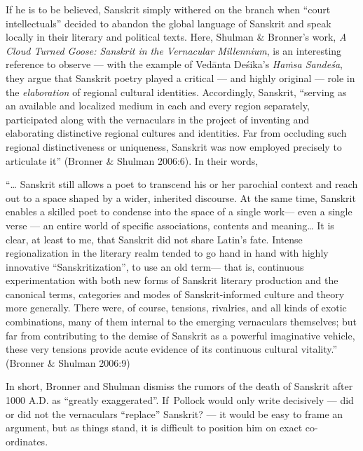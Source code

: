If he is to be believed, Sanskrit simply withered on the branch when “court intellectuals” decided to abandon the global language of Sanskrit and speak locally in their literary and political texts. Here, Shulman \& Bronner’s work, {\sl A Cloud Turned Goose: Sanskrit in the Vernacular Millennium}, is an interesting reference to observe — with the example of Vedānta Deśika’s {\sl Haṁsa Sandeśa}, they argue that Sanskrit poetry played a critical — and highly original — role in the {\sl elaboration} of regional cultural identities. Accordingly, Sanskrit, “serving as an available and localized medium in each and every region separately, participated along with the vernaculars in the project of inventing and elaborating distinctive regional cultures and identities. Far from occluding such regional distinctiveness or uniqueness, Sanskrit was now employed precisely to articulate it” (Bronner \& Shulman 2006:6). In their words,
\begin{myquote}
“… Sanskrit still allows a poet to transcend his or her parochial context and reach out to a space shaped by a wider, inherited discourse. At the same time, Sanskrit enables a skilled poet to condense into the space of a single work— even a single verse — an entire world of specific associations, contents and meaning… It is clear, at least to me, that Sanskrit did not share Latin’s fate. Intense regionalization in the literary realm tended to go hand in hand with highly innovative “Sanskritization”, to use an old term— that is, continuous experimentation with both new forms of Sanskrit literary production and the canonical terms, categories and modes of Sanskrit-informed culture and theory more generally. There were, of course, tensions, rivalries, and all kinds of exotic combinations, many of them internal to the emerging vernaculars themselves; but far from contributing to the demise of Sanskrit as a powerful imaginative vehicle, these very tensions provide acute evidence of its continuous cultural vitality.”	
\hfill{(Bronner \& Shulman 2006:9)}
\end{myquote}

In short, Bronner and Shulman dismiss the rumors of the death of Sanskrit after 1000 A.D. as “greatly exaggerated”. If\, Pollock would only write decisively — did or did not the vernaculars “replace” Sanskrit? — it would be easy to frame an argument, but as things stand, it is difficult to position him on exact co-ordinates. 

